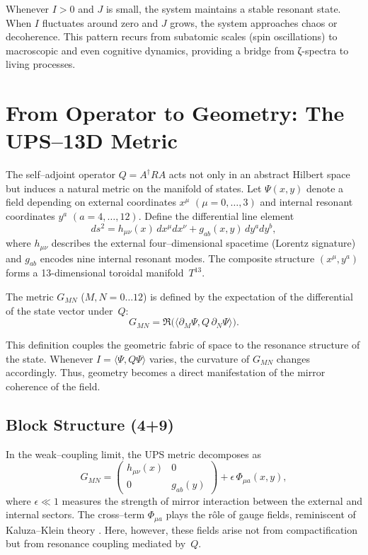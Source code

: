 Whenever $I>0$ and $J$ is small,
the system maintains a stable resonant state.
When $I$ fluctuates around zero and $J$ grows,
the system approaches chaos or decoherence.
This pattern recurs from subatomic scales (spin oscillations)
to macroscopic and even cognitive dynamics,
providing a bridge from ζ-spectra to living processes.


\section{From Operator to Geometry: The UPS–13D Metric}

The self–adjoint operator $Q=A^{\dagger}RA$ acts not only in an abstract
Hilbert space but induces a natural metric on the manifold of states.
Let $\Psi(x,y)$ denote a field depending on external coordinates
$x^{\mu}$ $(\mu=0,\dots,3)$ and internal resonant coordinates
$y^{a}$ $(a=4,\dots,12)$.
Define the differential line element
\[
ds^2 = h_{\mu\nu}(x) \, dx^{\mu}dx^{\nu}
      + g_{ab}(x,y)\, dy^{a}dy^{b},
\]
where $h_{\mu\nu}$ describes the external
four–dimensional spacetime (Lorentz signature)
and $g_{ab}$ encodes nine internal resonant modes.
The composite structure $(x^{\mu},y^{a})$ forms
a 13-dimensional toroidal manifold~$T^{13}$.

\begin{definition}
The metric $G_{MN}$ ($M,N=0\dots12$) is defined by the expectation
of the differential of the state vector under~$Q$:
\[
G_{MN} = \Re \big( \langle \partial_M \Psi, Q \, \partial_N \Psi \rangle \big).
\]
\end{definition}

This definition couples the geometric fabric of space
to the resonance structure of the state.
Whenever $I=\langle\Psi,Q\Psi\rangle$ varies,
the curvature of $G_{MN}$ changes accordingly.
Thus, geometry becomes a direct manifestation
of the mirror coherence of the field.

\subsection{Block Structure (4+9)}

In the weak–coupling limit, the UPS metric decomposes as
\[
G_{MN} =
\begin{pmatrix}
h_{\mu\nu}(x) & 0 \\[4pt]
0 & g_{ab}(y)
\end{pmatrix}
+ \epsilon\,\Phi_{\mu a}(x,y),
\]
where $\epsilon\ll1$ measures the strength of mirror interaction
between the external and internal sectors.
The cross–term $\Phi_{\mu a}$ plays the rôle of gauge fields,
reminiscent of Kaluza–Klein theory
\cite{OverduinWesson1997}.
Here, however, these fields arise not from compactification
but from resonance coupling mediated by~$Q$.

